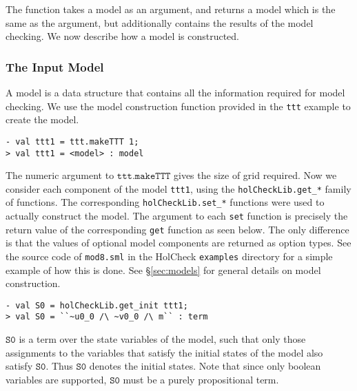 The function takes a \hc{} model as an argument, and returns a model which is the same as the argument, but additionally contains the results of the model checking. We now describe how a \hc{} model is constructed.

\subsubsection{The Input Model}

A \hc{} model is a data structure that contains all the information required for model checking. We use the model construction function provided in the \texttt{ttt} example to create the model.

\begin{session}\begin{verbatim}
- val ttt1 = ttt.makeTTT 1;
> val ttt1 = <model> : model
\end{verbatim}\end{session}

The numeric argument to \(\mathtt{ttt.makeTTT}\) gives the size of grid required.  Now we consider each component of the model \texttt{ttt1}, using the \texttt{holCheckLib.get\_*} family of functions. The corresponding \texttt{holCheckLib.set\_*} functions were used to actually construct the model. The argument to each \texttt{set} function is precisely the return value of the corresponding \texttt{get} function as seen below. The only difference is that the values of optional model components are returned as option types. See the source code of \texttt{mod8.sml} in the HolCheck \texttt{examples} directory for a simple example of how this is done. See \S\ref{sec:models} for general details on model construction.

\begin{session}\begin{verbatim}
- val S0 = holCheckLib.get_init ttt1;
> val S0 = ``~u0_0 /\ ~v0_0 /\ m`` : term
\end{verbatim}\end{session}
\(\mathtt{S0}\) is a term over the state variables of the model, such that only those assignments to the variables that satisfy the initial states of the model also satisfy \(\mathtt{S0}\). Thus \(\mathtt{S0}\) denotes the initial states. Note that since only boolean variables are supported, \(\mathtt{S0}\) must be a purely propositional term.

